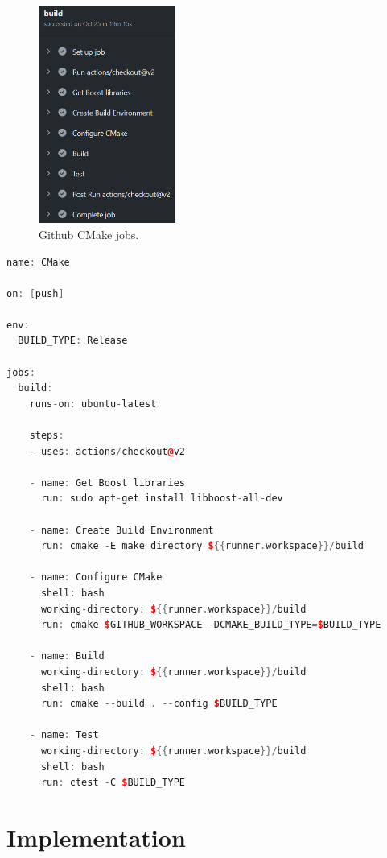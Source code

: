 \documentclass[a4paper,12pt]{book}
\begin{document}
{\begin{figure}[H]
  \centering
    \includegraphics[width=0.4\textwidth]{jobs}
    \caption{Github CMake jobs.}
    \label{fig:cmakejobs}
\end{figure}  

\begin{lstlisting}[frame=single, label={lst:cmakeyaml}, basicstyle=\small, language=C++, caption={cmake.yaml docker image used in project to set up automation server.}, captionpos=b, float]
name: CMake

on: [push]

env:
  BUILD_TYPE: Release

jobs:
  build:
    runs-on: ubuntu-latest

    steps:
    - uses: actions/checkout@v2
      
    - name: Get Boost libraries
      run: sudo apt-get install libboost-all-dev
      
    - name: Create Build Environment
      run: cmake -E make_directory ${{runner.workspace}}/build

    - name: Configure CMake
      shell: bash
      working-directory: ${{runner.workspace}}/build
      run: cmake $GITHUB_WORKSPACE -DCMAKE_BUILD_TYPE=$BUILD_TYPE

    - name: Build
      working-directory: ${{runner.workspace}}/build
      shell: bash
      run: cmake --build . --config $BUILD_TYPE

    - name: Test
      working-directory: ${{runner.workspace}}/build
      shell: bash
      run: ctest -C $BUILD_TYPE
\end{lstlisting}
}

\chapter{Implementation}
\end{document}
